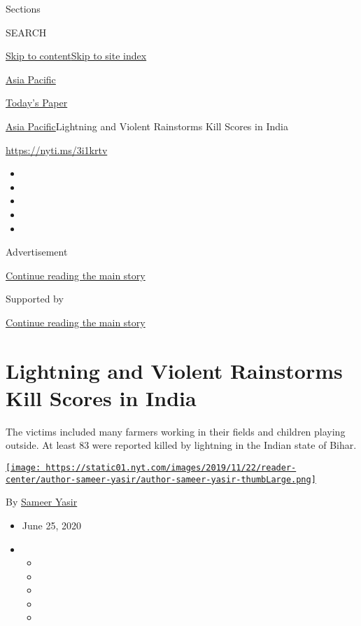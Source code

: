 Sections

SEARCH

\protect\hyperlink{site-content}{Skip to
content}\protect\hyperlink{site-index}{Skip to site index}

\href{https://www.nytimes.com/section/world/asia}{Asia Pacific}

\href{https://myaccount.nytimes.com/auth/login?response_type=cookie\&client_id=vi}{}

\href{https://www.nytimes.com/section/todayspaper}{Today's Paper}

\href{/section/world/asia}{Asia Pacific}\textbar{}Lightning and Violent
Rainstorms Kill Scores in India

\url{https://nyti.ms/3i1krtv}

\begin{itemize}
\item
\item
\item
\item
\item
\end{itemize}

Advertisement

\protect\hyperlink{after-top}{Continue reading the main story}

Supported by

\protect\hyperlink{after-sponsor}{Continue reading the main story}

\hypertarget{lightning-and-violent-rainstorms-kill-scores-in-india}{%
\section{Lightning and Violent Rainstorms Kill Scores in
India}\label{lightning-and-violent-rainstorms-kill-scores-in-india}}

The victims included many farmers working in their fields and children
playing outside. At least 83 were reported killed by lightning in the
Indian state of Bihar.

\href{https://www.nytimes.com/by/sameer-yasir}{\texttt{[image: https://static01.nyt.com/images/2019/11/22/reader-center/author-sameer-yasir/author-sameer-yasir-thumbLarge.png]}}

By \href{https://www.nytimes.com/by/sameer-yasir}{Sameer Yasir}

\begin{itemize}
\item
  June 25, 2020
\item
  \begin{itemize}
  \item
  \item
  \item
  \item
  \item
  \end{itemize}
\end{itemize}

